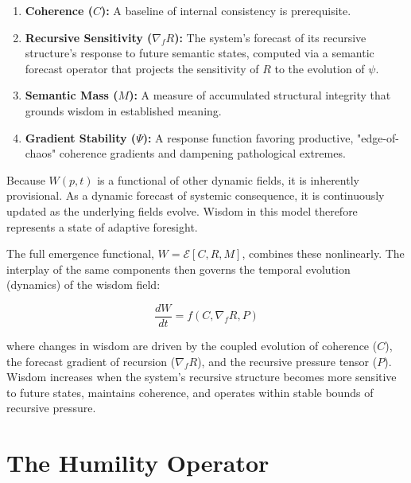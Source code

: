 \begin{enumerate}

    \item \textbf{Coherence (\(C\)):} A baseline of internal consistency is prerequisite.
    
    \item \textbf{Recursive Sensitivity (\(\nabla_f R\)):} The system's forecast of its recursive structure's response to future semantic states, computed via a semantic forecast operator that projects the sensitivity of \(R\) to the evolution of \(\psi\).
    
    \item \textbf{Semantic Mass (\(M\)):} A measure of accumulated structural integrity that grounds wisdom in established meaning.
    
    \item \textbf{Gradient Stability (\(\Psi\)):} A response function favoring productive, "edge-of-chaos" coherence gradients and dampening pathological extremes.

\end{enumerate}

Because \(W(p,t)\) is a functional of other dynamic fields, it is inherently provisional. As a dynamic forecast of systemic consequence, it is continuously updated as the underlying fields evolve. Wisdom in this model therefore represents a state of adaptive foresight.

The full emergence functional, \(W = \mathcal{E}[C, R, M]\), combines these nonlinearly. The interplay of the same components then governs the temporal evolution (dynamics) of the wisdom field:

\begin{equation}
\frac{dW}{dt} = f(C, \nabla_f R, P)
\end{equation}

where changes in wisdom are driven by the coupled evolution of coherence (\(C\)), the forecast gradient of recursion (\(\nabla_f R\)), and the recursive pressure tensor (\(P\)). Wisdom increases when the system's recursive structure becomes more sensitive to future states, maintains coherence, and operates within stable bounds of recursive pressure.


\section{The Humility Operator}
\label{sec:the_humility_operator}

